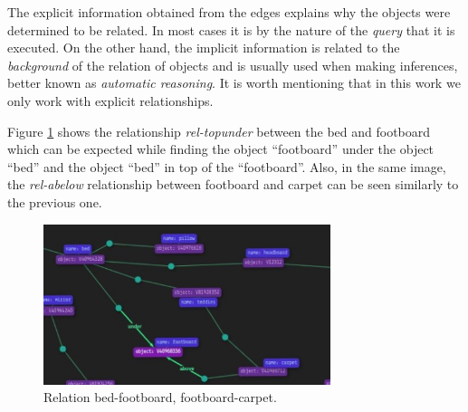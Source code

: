 The explicit information obtained from the edges explains why the objects 
were determined to be related. In most cases it is by the nature of the 
\textit{query} that it is executed. On the other hand, the implicit 
information is related to the \textit{background} of the relation of objects 
and is usually used when making inferences, better known as 
\textit{automatic reasoning}. It is worth mentioning that in this work we only 
work with explicit relationships.

Figure \ref{fig:ReGra} shows the relationship \textit{rel-topunder} between the 
bed and footboard which can be expected while finding the object ``footboard'' 
under the object ``bed'' and the object ``bed'' in top of the ``footboard''. 
Also, in the same image, the \textit{rel-abelow} relationship between footboard 
and carpet can be seen similarly to the previous one.

\begin{figure}[H]
    \centering
    \includegraphics[width=8.4cm]{figures/realcionGrafo.jpeg}
    \caption{Relation bed-footboard, footboard-carpet.}
    \label{fig:ReGra}
\end{figure}

